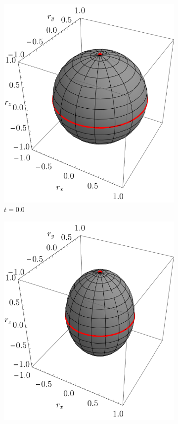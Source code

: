 \begin{figure}[ht!]
    \centering
    \begin{subfigure}{0.32\textwidth}
      \centering
      \includegraphics[width=0.9\linewidth]{chapter4/figures_separable/szxId_t=0._p=0.6_r=0.9.pdf}
      \caption{$t=0.0$}
    \end{subfigure}%
    \begin{subfigure}{0.32\textwidth}
      \centering
      \includegraphics[width=0.9\linewidth]{chapter4/figures_separable/szxId_t=0.25_p=0.6_r=0.9.pdf}

\end{subfigure}
\end{figure}
